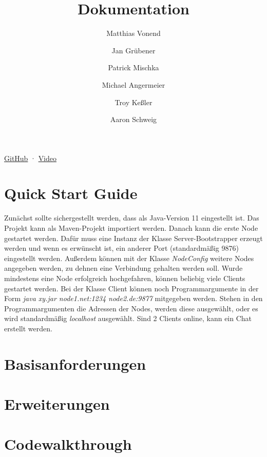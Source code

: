 \documentclass[a4paper]{article}
\title{Dokumentation}
\author{
    Matthias Vonend
    \and
    Jan Grübener
    \and
    Patrick Mischka
    \and
    Michael Angermeier
    \and
    Troy Keßler
    \and
    Aaron Schweig
}
\theoremstyle{definition}
\begin{document}
    \maketitle

    \begin{center}
      \href{https://github.com/aaronschweig/vs-chat/}{GitHub}
      ·
      \href{https://youtu.be/ZKApXYr4j58}{Video}
    \end{center}

    \tableofcontents
    \clearpage

    \author{}
    \section{Quick Start Guide}
    Zunächst sollte sichergestellt werden, dass als Java-Version 11 eingestellt ist. Das Projekt kann als Maven-Projekt importiert werden.
    Danach kann die erste Node gestartet werden. Dafür muss eine Instanz der Klasse Server-Bootstrapper erzeugt werden
    und wenn es erwünscht ist, ein anderer Port (standardmäßig 9876) eingestellt werden. Außerdem können mit der Klasse \textit{NodeConfig} weitere Nodes angegeben werden, zu dehnen eine Verbindung gehalten werden soll.
    Wurde mindestens eine Node erfolgreich hochgefahren, können beliebig viele Clients gestartet werden. Bei der Klasse Client
    können noch Programmargumente in der Form \textit{java xy.jar node1.net:1234 node2.de:9877} mitgegeben werden. Stehen in den Programmargumenten die Adressen der Nodes, werden
    diese ausgewählt, oder es wird standardmäßig \textit{localhost} ausgewählt.
    Sind 2 Clients online, kann ein Chat erstellt werden.
    \author{}
    \section{Basisanforderungen}
        
    \author{}
    \section{Erweiterungen}
        
    \clearpage
    \author{}
    \section{Codewalkthrough}
        
    
\end{document}
